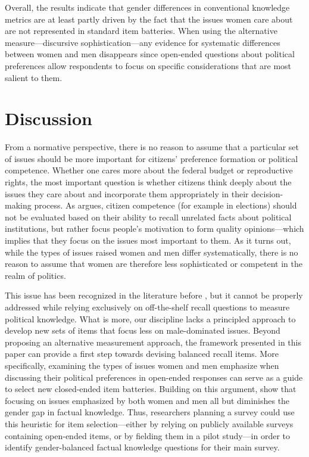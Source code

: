 Overall, the results indicate that gender differences in conventional knowledge metrics are at least partly driven by the fact that the issues women care about are not represented in standard item batteries. When using the alternative measure---discursive sophistication---any evidence for systematic differences between women and men disappears since open-ended questions about political preferences allow respondents to focus on specific considerations that are most salient to them. 



\section*{Discussion}

From a normative perspective, there is no reason to assume that a particular set of issues should be more important for citizens' preference formation or political competence. Whether one cares more about the federal budget or reproductive rights, the most important question is whether citizens think deeply about the issues they care about and incorporate them appropriately in their decision-making process. As \citet{druckman2014pathologies} argues, citizen competence (for example in elections) should not be evaluated based on their ability to recall unrelated facts about political institutions, but rather focus people's motivation to form quality opinions---which implies that they focus on the issues most important to them. As it turns out, while the types of issues raised women and men differ systematically, there is no reason to assume that women are therefore less sophisticated or competent in the realm of politics.

This issue has been recognized in the literature before \citep[e.g.,][]{graber2001processing,dolan2011women,ferrin2020gender}, but it cannot be properly addressed while relying exclusively on off-the-shelf recall questions to measure political knowledge. What is more, our discipline lacks a principled approach to develop new sets of items that focus less on male-dominated issues. Beyond proposing an alternative measurement approach, the framework presented in this paper can provide a first step towards devising balanced recall items. More specifically, examining the types of issues women and men emphasize when discussing their political preferences in open-ended responses can serve as a guide to select new closed-ended item batteries. Building on this argument, \citet{kraft2022asking} show that focusing on issues emphasized by both women and men all but diminishes the gender gap in factual knowledge. Thus, researchers planning a survey could use this heuristic for item selection---either by relying on publicly available surveys containing open-ended items, or by fielding them in a pilot study---in order to identify gender-balanced factual knowledge questions for their main survey.


